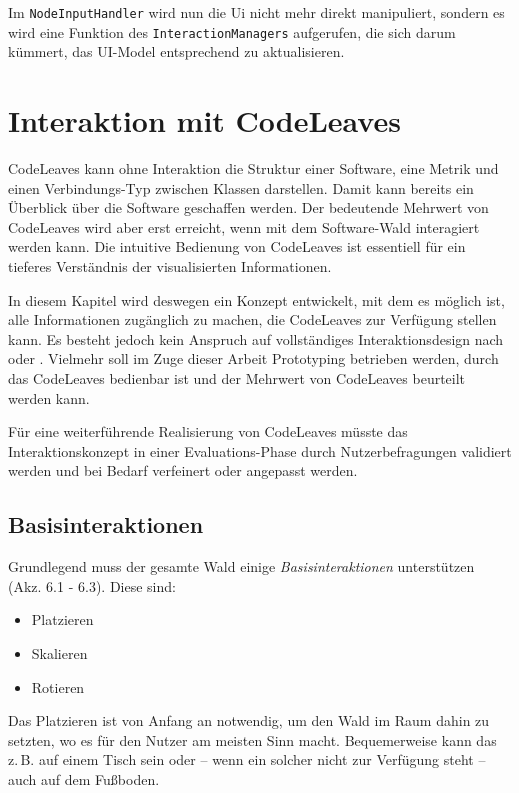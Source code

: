 Im \texttt{NodeInputHandler} wird nun die Ui nicht mehr direkt manipuliert, sondern es wird eine Funktion des \texttt{InteractionManagers} aufgerufen, die sich darum kümmert, das UI-Model entsprechend zu aktualisieren.

\chapter{Interaktion mit CodeLeaves}
\label{ch:interaction}

CodeLeaves kann ohne Interaktion die Struktur einer Software, eine Metrik und einen Verbindungs-Typ zwischen Klassen darstellen. Damit kann bereits ein Überblick über die Software geschaffen werden. Der bedeutende Mehrwert von CodeLeaves wird aber erst erreicht, wenn mit dem Software-Wald interagiert werden kann. Die intuitive Bedienung von CodeLeaves ist essentiell für ein tieferes Verständnis der visualisierten Informationen.

In diesem Kapitel wird deswegen ein Konzept entwickelt, mit dem es möglich ist, alle Informationen zugänglich zu machen, die CodeLeaves zur Verfügung stellen kann. Es besteht jedoch kein Anspruch auf vollständiges Interaktionsdesign nach \cite{goodwin2011designing} oder \cite{cooper2014face}. Vielmehr soll im Zuge dieser Arbeit Prototyping betrieben werden, durch das CodeLeaves bedienbar ist und der Mehrwert von CodeLeaves beurteilt werden kann.

Für eine weiterführende Realisierung von CodeLeaves müsste das Interaktionskonzept in einer Evaluations-Phase durch Nutzerbefragungen validiert werden und bei Bedarf verfeinert oder angepasst werden.

\section{Basisinteraktionen}
Grundlegend muss der gesamte Wald einige \textit{Basisinteraktionen} unterstützen (Akz. 6.1 - 6.3). Diese sind:

\begin{itemize}
  \item Platzieren
  \item Skalieren
  \item Rotieren
\end{itemize}

Das Platzieren ist von Anfang an notwendig, um den Wald im Raum dahin zu setzten, wo es für den Nutzer am meisten Sinn macht. Bequemerweise kann das z.\,B. auf einem Tisch sein oder -- wenn ein solcher nicht zur Verfügung steht -- auch auf dem Fußboden.

